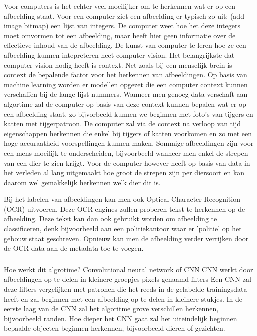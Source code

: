 Voor computers is het echter veel moeilijker om te herkennen wat er op een afbeelding staat. Voor een computer ziet een afbeelding er typisch zo uit:
(add image bitmap) een lijst van integers. De computer weet hoe het deze integers moet omvormen tot een afbeelding, maar heeft hier geen informatie over de effectieve inhoud van de afbeelding.
De kunst van computer te leren hoe ze een afbeelding kunnen intepreteren heet computer vision. 
Het belangrijkste dat computer vision nodig heeft is context. Net zoals bij een menselijk brein is context de bepalende factor voor het herkennen van afbeeldingen.
Op basis van machine learning worden er modellen opgezet die een computer context kunnen verschaffen bij de lange lijst nummers.
Wanneer men genoeg data verschaft aan algortime zal de computer op basis van deze context kunnen bepalen wat er op een afbeelding staat. zo bijvorbeeld kunnen we beginnen met foto's van tijgers en katten met tijgerpatroon. De computer zal via de context na verloop van tijd eigenschappen herkennen die enkel bij tijgers of katten voorkomen en zo met een hoge accuraatheid voorspellingen kunnen maken. Sommige afbeeldingen zijn voor een mens moeilijk te onderscheiden, bijvoorbeeld wanneer men enkel de strepen van een dier te zien krijgt. Voor de computer however heeft op basis van data in het verleden al lang uitgemaakt hoe groot de strepen zijn per diersoort en kan daarom wel gemakkelijk herkennen welk dier dit is.

Bij  het labelen van afbeeldingen kan men ook Optical Character Recognition (OCR) uitvoeren. Deze OCR engines zullen proberen tekst te herkennen op de afbeelding. Deze tekst kan dan ook gebruikt worden om afbeelding te classificeren, denk bijvoorbeeld aan een politiekantoor waar er 'politie' op het gebouw staat geschreven. Opnieuw kan men de afbeelding verder verrijken door de OCR data aan de metadata toe te voegen.

\subsubsection{}
\label{sec:convolutional-neural-network}
Hoe werkt dit algrotime? Convolutional neural network of CNN
CNN werkt door afbeeldingen op te delen in kleinere groepjes pixels genaamd filters
Een CNN zal deze filters vergelijken met patronen die het reeds in de gelabelde trainingsdata heeft en zal beginnen met een afbeelding op te delen in kleinere stukjes. 
In de eerste laag van de CNN zal het algoritme grove verschillen herkennen, bijvoorbeeld randen.
Hoe dieper het CNN gaat zal het uiteindelijk beginnen bepaalde objecten beginnen herkennen, bijvoorbeeld dieren of gezichten.

